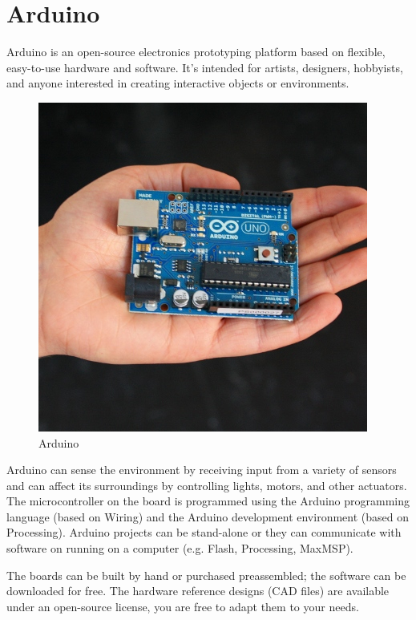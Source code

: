 \chapter{Arduino}


Arduino is an open-source electronics prototyping platform based on flexible, easy-to-use hardware and software. It's intended for artists, designers, hobbyists, and anyone interested in creating interactive objects or environments.

\begin{figure}[!htb]
     \centering
     \includegraphics[scale=0.5]{img/arduino/arduino_uno_test.jpg}
     \caption{Arduino}
     \label{Arduino}
\end{figure}

Arduino can sense the environment by receiving input from a variety of sensors and can affect its surroundings by controlling lights, motors, and other actuators. The microcontroller on the board is programmed using the Arduino programming language (based on Wiring) and the Arduino development environment (based on Processing). Arduino projects can be stand-alone or they can communicate with software on running on a computer (e.g. Flash, Processing, MaxMSP).

The boards can be built by hand or purchased preassembled; the software can be downloaded for free. The hardware reference designs (CAD files) are available under an open-source license, you are free to adapt them to your needs.


